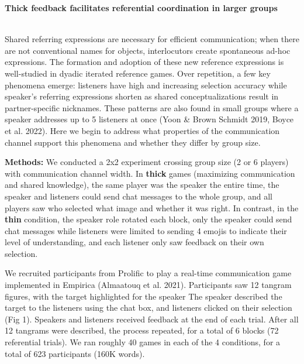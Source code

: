 \documentclass[11pt,a4paper]{article}
\renewcommand{\title}[1]{\textbf{#1}\\}
\newcommand{\authors}[1]{\iftoggle{anonymous}{\phantom{#1}}{#1}\\}
\newcommand{\email}[1]{\iftoggle{anonymous}{\phantom{#1}}{#1}}
\begin{document}


\title{Thick feedback facilitates referential coordination in larger groups}
\authors{Veronica Boyce\textsuperscript{1}, Robert D.  Hawkins\textsuperscript{2}, Noah D. Goodman\textsuperscript{1}, Michael C. Frank\textsuperscript{1}} 
\email{vboyce@stanford.edu;  \textsuperscript{1}Stanford, \textsuperscript{2}Princeton}
\newline
%

Shared referring expressions are necessary for efficient communication; when there are not conventional names for objects, interlocutors create spontaneous ad-hoc expressions. The formation and adoption of these new reference expressions is well-studied in dyadic iterated reference games. Over repetition, a few key phenomena emerge: listeners have high and increasing selection accuracy while speaker's referring expressions shorten as shared conceptualizations result in partner-specific nicknames. These patterns are also found in small groups where a speaker addresses up to 5 listeners at once (Yoon \& Brown Schmidt 2019, Boyce et al. 2022). Here we begin to address what properties of the communication channel support this phenomena and whether they differ by group size.

\textbf{Methods:} We conducted a 2x2 experiment crossing group size (2 or 6 players) with communication channel width. In \textbf{thick} games (maximizing communication and shared knowledge), the same player was the speaker the entire time, the speaker and listeners could send chat messages to the whole group, and all players saw who selected what image and whether it was right. In contrast, in the \textbf{thin} condition, the speaker role rotated each block, only the speaker could send chat messages while listeners were limited to sending 4 emojis to indicate their level of understanding, and each listener only saw feedback on their own selection.

We recruited participants from Prolific to play a real-time communication game implemented in Empirica (Almaatouq et al. 2021). Participants saw 12 tangram figures, with the target highlighted for the speaker The speaker described the target to the listeners using the chat box, and listeners clicked on their selection (Fig 1). Speakers and listeners received feedback at the end of each trial. After all 12 tangrams were described, the process repeated, for a total of 6 blocks (72 referential trials). We ran roughly 40 games in each of the 4 conditions, for a total of 623 participants (160K words). 
\end{document}
